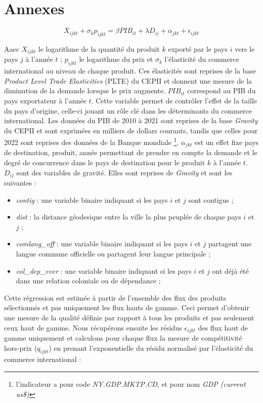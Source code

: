 \documentclass[french,10pt,a4paper]{article}
\newenvironment{annexes}{
    \section*{Annexes}
    \addcontentsline{toc}{section}{Annexes}
    \setstretch{2} %
}{
    \setstretch{1} %
}
\begin{document}
\begin{annexes}
\begin{equation}
\label{eq:2}
X_{ijkt} + \sigma_{k} p_{ijkt}  = \beta PIB_{it} + \lambda D_{ij} + \alpha_{jkt} + \epsilon_{ijkt}
\end{equation}

\noindent Aaec $X_{ijkt}$ le logarithme de la quantité du produit $k$ exporté par le pays $i$ vers le pays $j$ à l'année $t$ ; $p_{ijkt}$ le logarithme du prix et $\sigma_{k}$ l'élasticité du commerce international au niveau de chaque produit. Ces élasticités sont reprises de la base \textit{Product Level Trade Elasticities} (PLTE) du CEPII \citep{Fontagne2019} et donnent une mesure de la diminution de la demande lorsque le prix augmente. $PIB_{it}$ correspond au PIB du pays exportateur à l'année $t$. Cette variable permet de contrôler l'effet de la taille du pays d'origine, celle-ci jouant un rôle clé dans les déterminants du commerce international. Les données du PIB de 2010 à 2021 sont reprises de la base \textit{Gravity} du CEPII \citep{Conte2022} et sont exprimées en milliers de dollars courants, tandis que celles pour 2022 sont reprises des données de la Banque mondiale \footnote{l'indicateur a pour code \textit{NY.GDP.MKTP.CD}, et pour nom \textit{GDP (current us\$)}}. $\alpha_{jkt}$ est un effet fixe pays de destination, produit, année permettant de prendre en compte la demande et le degré de concurrence dans le pays de destination pour le produit $k$ à l'année $t$. $D_{ij}$ sont des variables de gravité. Elles sont reprises de \textit{Gravity} et sont les suivantes :

\begin{itemize}
  \item \textit{contig} : une variable binaire indiquant si les pays $i$ et $j$ sont contigus ;
  \item \textit{dist} : la distance géodesique entre la ville la plus peuplée de chaque pays $i$ et $j$ ;
  \item \textit{comlang\_off} : une variable binaire indiquant si les pays $i$ et $j$ partagent une langue commune officielle ou partagent leur langue principale ;
  \item \textit{col\_dep\_ever} : une variable binaire indiquant si les pays $i$ et $j$ ont déjà été dans une relation coloniale ou de dépendance ;
\end{itemize}

\bigskip

Cette régression est estimée à partir de l'ensemble des flux des produits sélectionnés et pas uniquement les flux hauts de gamme. Ceci permet d'obtenir une mesure de la qualité définie par rapport à tous les produits et pas seulement ceux haut de gamme. Nous récupérons ensuite les résidus $\epsilon_{ijkt}$ des flux haut de gamme uniquement et calculons pour chaque flux la mesure de compétitivité hors-prix ($q_{ijkt}$) en prenant l'exponentielle du résidu normalisé par l'élasticité du commerce international : 


\end{annexes}
\end{document}
